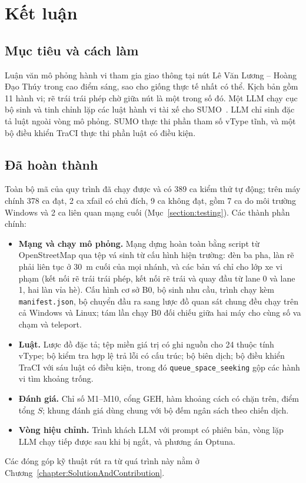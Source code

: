 \documentclass[../DoAn.tex]{subfiles}
\begin{document}

\section{Kết luận}

\subsection{Mục tiêu và cách làm}

Luận văn mô phỏng hành vi tham gia giao thông tại nút Lê Văn Lương -- Hoàng Đạo Thúy trong cao điểm sáng, sao cho giống thực tế nhất có thể. Kịch bản gồm 11 hành vi; rẽ trái trái phép chờ giữa nút là một trong số đó. Một LLM chạy cục bộ sinh và tinh chỉnh lặp các luật hành vi tài xế cho SUMO~\cite{lopez2018sumo}. LLM chỉ sinh đặc tả luật ngoài vòng mô phỏng. SUMO thực thi phần tham số vType tĩnh, và một bộ điều khiển TraCI thực thi phần luật có điều kiện.

\subsection{Đã hoàn thành}

Toàn bộ mã của quy trình đã chạy được và có 389 ca kiểm thử tự động; trên máy chính 378 ca đạt, 2 ca xfail có chủ đích, 9 ca không đạt, gồm 7 ca do môi trường Windows và 2 ca liên quan mạng cuối (Mục~\ref{section:testing}). Các thành phần chính:
\begin{itemize}
    \item \textbf{Mạng và chạy mô phỏng.} Mạng dựng hoàn toàn bằng script từ OpenStreetMap qua tệp vá sinh từ cấu hình hiện trường: đèn ba pha, làn rẽ phải liên tục ở 30~m cuối của mọi nhánh, và các bản vá chỉ cho lớp xe vi phạm (kết nối rẽ trái trái phép, kết nối rẽ trái và quay đầu từ lane 0 và lane 1, hai làn vỉa hè). Cấu hình cơ sở B0, bộ sinh nhu cầu, trình chạy kèm \texttt{manifest.json}, bộ chuyển đầu ra sang lược đồ quan sát chung đều chạy trên cả Windows và Linux; tám lần chạy B0 đối chiếu giữa hai máy cho cùng số va chạm và teleport.
    \item \textbf{Luật.} Lược đồ đặc tả; tệp miền giá trị có ghi nguồn cho 24 thuộc tính vType; bộ kiểm tra hợp lệ trả lỗi có cấu trúc; bộ biên dịch; bộ điều khiển TraCI với sáu luật có điều kiện, trong đó \texttt{queue\_space\_seeking} gộp các hành vi tìm khoảng trống.
    \item \textbf{Đánh giá.} Chỉ số M1--M10, cổng GEH, hàm khoảng cách có chặn trên, điểm tổng $S$; khung đánh giá dùng chung với bộ đếm ngân sách theo chiến dịch.
    \item \textbf{Vòng hiệu chỉnh.} Trình khách LLM với prompt có phiên bản, vòng lặp LLM chạy tiếp được sau khi bị ngắt, và phương án Optuna.
\end{itemize}
Các đóng góp kỹ thuật rút ra từ quá trình này nằm ở Chương~\ref{chapter:SolutionAndContribution}.
\end{document}
